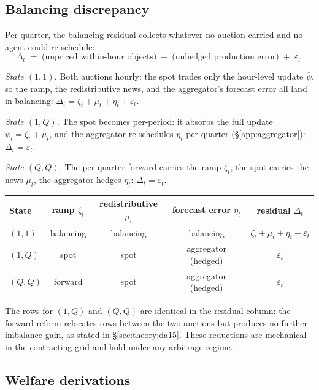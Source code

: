 \documentclass[11pt,a4paper]{article}
\theoremstyle{definition}
\theoremstyle{remark}
\theoremstyle{plain}
\begin{document}
\subsection{Balancing discrepancy}\label{app:balancing}

Per quarter, the balancing residual collects whatever no auction carried and no agent could re-schedule:
\begin{equation}
\Delta_t \;=\; \bigl(\text{unpriced within-hour objects}\bigr) \;+\; \bigl(\text{unhedged production error}\bigr) \;+\; \varepsilon_t.
\label{eq:balancing-disc}
\end{equation}

\emph{State $(1,1)$.} Both auctions hourly: the spot trades only the hour-level update $\bar\psi$, so the ramp, the redistributive news, and the aggregator's forecast error all land in balancing: $\Delta_t = \zeta_t + \mu_t + \eta_t + \varepsilon_t$.

\emph{State $(1,Q)$.} The spot becomes per-period: it absorbs the full update $\psi_t = \zeta_t + \mu_t$, and the aggregator re-schedules $\eta_t$ per quarter (\S\ref{app:aggregator}): $\Delta_t = \varepsilon_t$.

\emph{State $(Q,Q)$.} The per-quarter forward carries the ramp $\zeta_t$, the spot carries the news $\mu_t$, the aggregator hedges $\eta_t$: $\Delta_t = \varepsilon_t$.

\begin{center}
\footnotesize
\begin{tabular}{l c c c c}
\toprule
State & ramp $\zeta_t$ & redistributive $\mu_t$ & forecast error $\eta_t$ & residual $\Delta_t$ \\
\midrule
$(1,1)$ & balancing & balancing & balancing & $\zeta_t + \mu_t + \eta_t + \varepsilon_t$ \\
$(1,Q)$ & spot      & spot      & aggregator (hedged) & $\varepsilon_t$ \\
$(Q,Q)$ & forward   & spot      & aggregator (hedged) & $\varepsilon_t$ \\
\bottomrule
\end{tabular}
\end{center}

The rows for $(1,Q)$ and $(Q,Q)$ are identical in the residual column: the forward reform relocates rows between the two auctions but produces no further imbalance gain, as stated in \S\ref{sec:theory:da15}. These reductions are mechanical in the contracting grid and hold under any arbitrage regime.

\subsection{Welfare derivations}\label{app:welfare}
\end{document}
